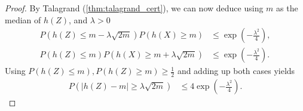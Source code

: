 \begin{aufgabe}
\begin{enumerate}[(a)]
\begin{proof}
                  By Talagrand (\autoref{thm:talagrand_cert}), we can now deduce using $m$ as the median of $h(Z)$, and $\lambda > 0$
                  \begin{align*}
                      P(h(Z) \leq m - \lambda\sqrt{2m})P(h(X) \geq m)  & \leq \exp\left(-\frac{\lambda^2}{4}\right), \\
                      P(h(Z) \leq m )P(h(X) \geq m + \lambda\sqrt{2m}) & \leq \exp\left(-\frac{\lambda^2}{4}\right).
                  \end{align*}
                  Using $P(h(Z) \leq m), P(h(Z) \geq m) \geq \frac{1}{2}$ and adding up both cases yields
                  \begin{align*}
                      P(|h(Z) - m | \geq \lambda\sqrt{2m}) & \leq 4\exp\left(-\frac{\lambda^2}{4}\right).
                  \end{align*}

              \end{proof}
    \end{enumerate}
\end{aufgabe}
